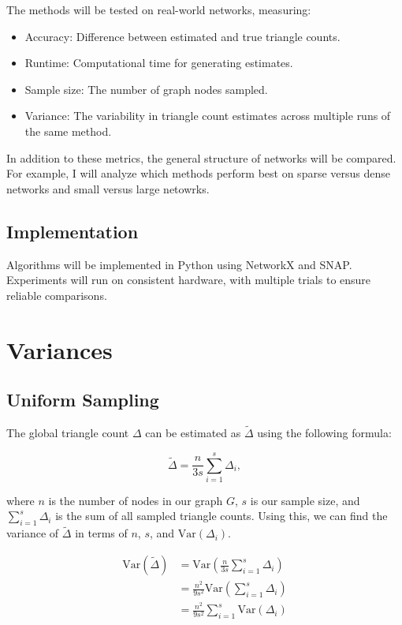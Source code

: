\documentclass[11pt]{article}
\begin{document}
The methods will be tested on real-world networks, measuring:

\begin{itemize}
    \item Accuracy: Difference between estimated and true triangle counts.
    \item Runtime: Computational time for generating estimates.
    \item Sample size: The number of graph nodes sampled.
    \item Variance: The variability in triangle count estimates across multiple runs of the same method.
\end{itemize}

In addition to these metrics, the general structure of networks will be compared.
For example, I will analyze which methods perform best on sparse versus dense networks and small versus large netowrks.

\subsection{Implementation}

Algorithms will be implemented in Python using NetworkX and SNAP.
Experiments will run on consistent hardware, with multiple trials to ensure reliable comparisons.

\newpage

\section{Variances}

\subsection{Uniform Sampling}

The global triangle count $\Delta$ can be estimated as $\tilde{\Delta}$ using the following formula:

\[
\tilde{\Delta} = \frac{n}{3s} \sum_{i = 1}^{s} \Delta_i,
\]

where $n$ is the number of nodes in our graph $G$, $s$ is our sample size, and $\sum_{i = 1}^{s} \Delta_i$ is the sum of all sampled triangle counts. 
Using this, we can find the variance of $\tilde{\Delta}$ in terms of $n$, $s$, and $\mathrm{Var}(\Delta_i)$.

\[
\begin{aligned}
\mathrm{Var}(\tilde{\Delta}) &= \mathrm{Var} \left( \frac{n}{3s} \sum_{i=1}^{s} \Delta_i \right) \\
&= \frac{n^2}{9s^2} \mathrm{Var} \left( \sum_{i=1}^{s} \Delta_i \right) \\
&= \frac{n^2}{9s^2} \sum_{i=1}^{s} \mathrm{Var}(\Delta_i)
\end{aligned}
\]
\end{document}
